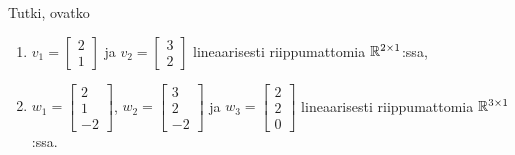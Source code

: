 \documentclass[11pt,a4paper]{amsart}
\begin{document}
\begin{exercise}
  Tutki, ovatko
  \begin{enumerate}[label=(\alph*), leftmargin=*]
    \item \(v_1 =
        \begin{bmatrix} 2 \\ 1
      \end{bmatrix}\) ja
      \(v_2 =
        \begin{bmatrix} 3 \\ 2
      \end{bmatrix}\) lineaarisesti
      riippumattomia \(\mathbb{R}^{2\times 1}\):ssa,
    \item \(w_1 =
        \begin{bmatrix} 2 \\ 1 \\ -2
      \end{bmatrix}\),
      \(w_2 =
        \begin{bmatrix} 3 \\ 2 \\ -2
      \end{bmatrix}\) ja
      \(w_3 =
        \begin{bmatrix} 2 \\ 2 \\ 0
      \end{bmatrix}\) lineaarisesti
      riippumattomia \(\mathbb{R}^{3\times 1}\):ssa.
  \end{enumerate}
\end{exercise}
\end{document}
